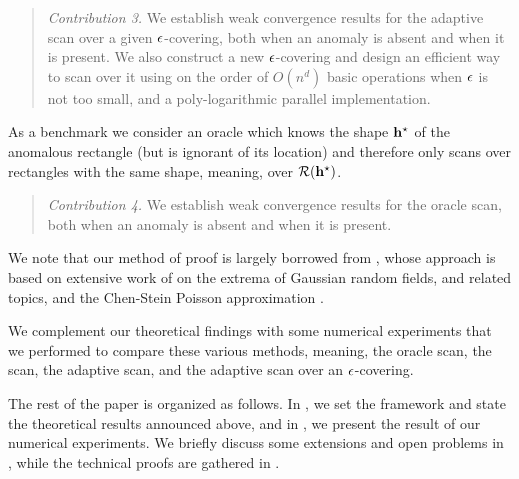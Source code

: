 \documentclass[twoside,11pt]{article}
\begin{document}
\begin{quote}
{\em Contribution 3.}  
We establish weak convergence results for the adaptive scan over a given $\epsilon$-covering, both when an anomaly is absent and when it is present. 
We also construct a new $\epsilon$-covering and design an efficient way to scan over it using on the order of $O(n^d)$ basic operations when $\epsilon$ is not too small, and a poly-logarithmic parallel implementation.
\end{quote}

As a benchmark we consider an oracle which knows the shape $\mathbf{h}^\star$ of the anomalous rectangle (but is ignorant of its location) and therefore only scans over rectangles with the same shape, meaning, over $\mathcal{R}(\mathbf{h}^\star)$.

\begin{quote}
{\em Contribution 4.}  
We establish weak convergence results for the oracle scan, both when an anomaly is absent and when it is present. 
\end{quote}

We note that our method of proof is largely borrowed from \cite{kabluchko2011extremes}, whose approach is based on extensive work of \cite{chan2006maxima} on the extrema of Gaussian random fields, and related topics, and the Chen-Stein Poisson approximation 
\citep{arratia1989two}.

We complement our theoretical findings with some numerical experiments that we performed to compare these various methods, meaning, the oracle scan, the scan, the adaptive scan, and the adaptive scan over an $\epsilon$-covering.

The rest of the paper is organized as follows.
In , we set the framework and state the theoretical results announced above, and in , we present the result of our numerical experiments.  
We briefly discuss some extensions and open problems in , while the technical proofs are gathered in .
\end{document}
